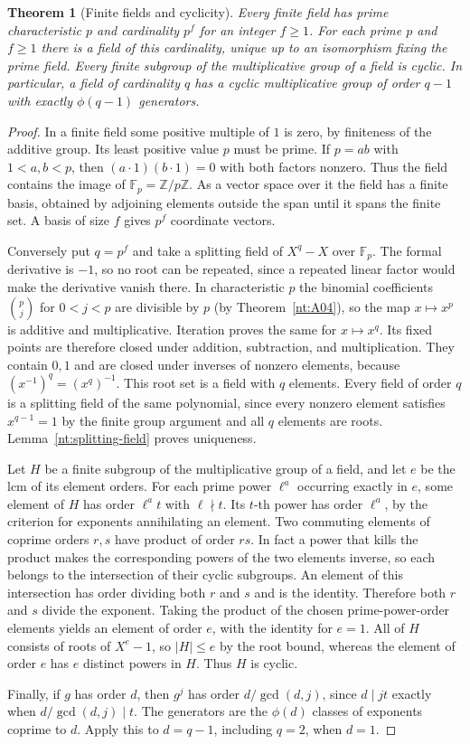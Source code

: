 \documentclass[11pt,oneside,openany]{book}
\theoremstyle{plain}
\newtheorem{theorem}{Theorem}[chapter]
\theoremstyle{definition}
\theoremstyle{remark}
\begin{document}
\begin{theorem}[Finite fields and cyclicity]\label{nt:B02}
Every finite field has prime characteristic $p$ and cardinality
$p^f$ for an integer $f\ge1$. For each prime $p$ and $f\ge1$
there is a field of this cardinality, unique up to an isomorphism
fixing the prime field. Every finite subgroup of the multiplicative
group of a field is cyclic. In particular, a field of cardinality
$q$ has a cyclic multiplicative group of order $q-1$ with exactly
$\phi(q-1)$ generators.
\end{theorem}
\begin{proof}
In a finite field some positive multiple of $1$ is zero, by
finiteness of the additive group. Its least positive value $p$
must be prime. If $p=ab$ with $1<a,b<p$, then
$(a\cdot1)(b\cdot1)=0$ with both factors nonzero. Thus the field
contains the image of $\mathbb F_p=\mathbb Z/p\mathbb Z$. As a
vector space over it the field has a finite basis, obtained by
adjoining elements outside the span until it spans the finite
set. A basis of size $f$ gives $p^f$ coordinate vectors.

Conversely put $q=p^f$ and take a splitting field of $X^q-X$
over $\mathbb F_p$. The formal derivative is $-1$, so no root
can be repeated, since a repeated linear factor would make the
derivative vanish there. In characteristic $p$ the binomial
coefficients $\binom pj$ for $0<j<p$ are divisible by $p$
(by Theorem~\ref{nt:A04}), so the map $x\mapsto x^p$ is additive
and multiplicative. Iteration proves the same for $x\mapsto x^q$.
Its fixed points are therefore closed under addition,
subtraction, and multiplication. They contain $0,1$ and are
closed under inverses of nonzero elements, because
$(x^{-1})^q=(x^q)^{-1}$. This root set is a field with $q$
elements. Every field of order $q$ is a splitting field of the
same polynomial, since every nonzero element satisfies
$x^{q-1}=1$ by the finite group argument and all $q$ elements
are roots. Lemma~\ref{nt:splitting-field} proves uniqueness.

Let $H$ be a finite subgroup of the multiplicative group of
a field, and let $e$ be the lcm of its element orders. For
each prime power $\ell^a$ occurring exactly in $e$, some element
of $H$ has order $\ell^a t$ with $\ell\nmid t$. Its $t$-th
power has order $\ell^a$, by the criterion for exponents
annihilating an element. Two commuting elements of coprime
orders $r,s$ have product of order $rs$. In fact a power that
kills the product makes the corresponding powers of the two
elements inverse, so each belongs to the intersection of
their cyclic subgroups. An element of this intersection has
order dividing both $r$ and $s$ and is the identity. Therefore
both $r$ and $s$ divide the exponent. Taking the product of the
chosen prime-power-order elements yields an element of order
$e$, with the identity for $e=1$. All of $H$ consists of roots
of $X^e-1$, so $|H|\le e$ by the root bound, whereas the element
of order $e$ has $e$ distinct powers in $H$. Thus $H$ is cyclic.

Finally, if $g$ has order $d$, then $g^j$ has order
$d/\gcd(d,j)$, since $d\mid jt$ exactly when
$d/\gcd(d,j)\mid t$. The generators are the $\phi(d)$ classes of
exponents coprime to $d$. Apply this to $d=q-1$, including
$q=2$, when $d=1$.
\end{proof}
\end{document}
